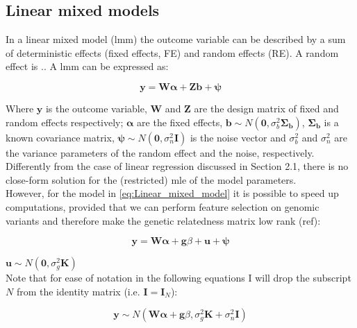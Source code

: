 \subsection{Linear mixed models}

In a linear mixed model (\gls{lmm}) the outcome variable can be described by a sum of deterministic effects (fixed effects, FE) and random effects (RE).
A random effect is ..
A \gls{lmm} can be expressed as:

\begin{equation}\label{eq:Linear_mixed_model}
 \mathbf{y} =  \mathbf{W}\boldsymbol{\alpha} + \mathbf{Z}\mathbf{b} + \boldsymbol{\psi} 
\end{equation}

Where $\mathbf{y}$ is the outcome variable, $\mathbf{W}$ and $\mathbf{Z}$ are the design matrix of fixed and random effects respectively; $\boldsymbol{\alpha}$ are the fixed effects, $\mathbf{b} \sim N(\mathbf{0},\sigma_b^2\boldsymbol{\Sigma_b})$, $\boldsymbol{\Sigma_b}$ is a known covariance matrix, $\boldsymbol{\psi} \sim N(\mathbf{0},\sigma_n^2\mathbf{I})$ is the noise vector and $\sigma_b^2$ and $\sigma_n^2$ are the variance parameters of the random effect and the noise, respectively.\\

Differently from the case of linear regression discussed in Section 2.1, there is no close-form solution for the (restricted) \gls{mle} of the model parameters. \\

However, for the model in \eqref{eq:Linear_mixed_model} it is possible to speed up computations, provided that we can perform feature selection on genomic variants and therefore make the genetic relatedness matrix low rank (ref): 

\begin{equation}\label{eq:Linear_mixed_model}
 \mathbf{y} =  \mathbf{W}\boldsymbol{\alpha} + \mathbf{g}\beta + \mathbf{u} + \boldsymbol{\psi} 
\end{equation}


$\mathbf{u} \sim N(\mathbf{0}, \sigma_g^2\mathbf{K})$\\


Note that for ease of notation in the following equations I will drop the subscript $N$ from the identity matrix (i.e. $\mathbf{I} = \mathbf{I}_N$):

\begin{equation}\label{eq34}
 \mathbf{y} \sim  N(\mathbf{W}\boldsymbol{\alpha} + \mathbf{g}\beta, \sigma_g^2\mathbf{K} + \sigma_n^2\mathbf{I})
\end{equation}

